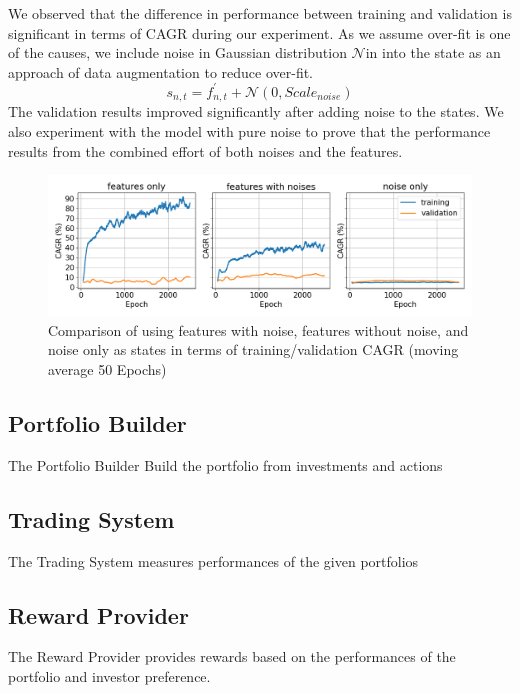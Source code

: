 We observed that the difference in performance between training and validation is significant in terms of CAGR during our experiment. As we assume over-fit is one of the causes, we include noise in Gaussian distribution \(\mathcal{N}\)in into the state as an approach of data augmentation to reduce over-fit.
\[
    s_{n,t} = f^{'}_{n,t} + \mathcal{N}(0,Scale_{noise})
\]
The validation results improved significantly after adding noise to the states. We also experiment with the model with pure noise to prove that the performance results from the combined effort of both noises and the features.
\begin{figure}[ht]
  \includegraphics[width=15cm]{images/compare_noise.png}
  \caption{Comparison of using features with noise, features without noise, and noise only as states in terms of training/validation CAGR (moving average 50 Epochs)}
  \label{fig:noise_diagram}
\end{figure}

\subsection {Portfolio Builder}
The Portfolio Builder Build the portfolio from investments and actions
\subsection {Trading System}
The Trading System measures performances of the given portfolios
\subsection {Reward Provider}
The Reward Provider provides rewards based on the performances of the portfolio and investor preference.